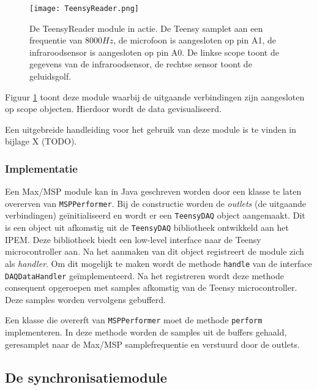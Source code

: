 \begin{figure}[h!]
	\captionsetup{width=0.8\textwidth}
	\caption[Screenshot van de TeensyReader in Max/MSP]{De TeensyReader module in actie. De Teensy samplet aan een frequentie van $8000 Hz$, de microfoon is aangesloten op pin A1, de infraroodsensor is aangesloten op pin A0. De linkse scope toont de gegevens van de infraroodsensor, de rechtse sensor toont de geluidsgolf.}
	\begin{center}
		\advance\parskip0.3cm
		\texttt{[image: TeensyReader.png]}
	\end{center}
	\label{teensyReader}
\end{figure}

Figuur \ref{teensyReader} toont deze module waarbij de uitgaande verbindingen zijn aangesloten op scope objecten. Hierdoor wordt de data gevisualiseerd.

Een uitgebreide handleiding voor het gebruik van deze module is te vinden in bijlage X (TODO).

\subsubsection{Implementatie}

Een Max/MSP module kan in Java geschreven worden door een klasse te laten overerven van \texttt{MSPPerformer}. Bij de constructie worden de \textit{outlets} (de uitgaande verbindingen) geïnitialiseerd en wordt er een \texttt{TeensyDAQ} object aangemaakt. Dit is een object uit afkomstig uit de \texttt{TeensyDAQ} bibliotheek ontwikkeld aan het IPEM. Deze bibliotheek biedt een low-level interface naar de Teensy microcontroller aan. Na het aanmaken van dit object registreert de module zich als \textit{handler}. Om dit mogelijk te maken wordt de methode \texttt{handle} van de interface \texttt{DAQDataHandler} geïmplementeerd. Na het registreren wordt deze methode consequent opgeroepen met samples afkomstig van de Teensy microcontroller. Deze samples worden vervolgens gebufferd.

Een klasse die overerft van \texttt{MSPPerformer} moet de methode \texttt{perform} implementeren. In deze methode worden de samples uit de buffers gehaald, geresamplet naar de Max/MSP samplefrequentie en verstuurd door de outlets.

\subsection{De synchronisatiemodule}

